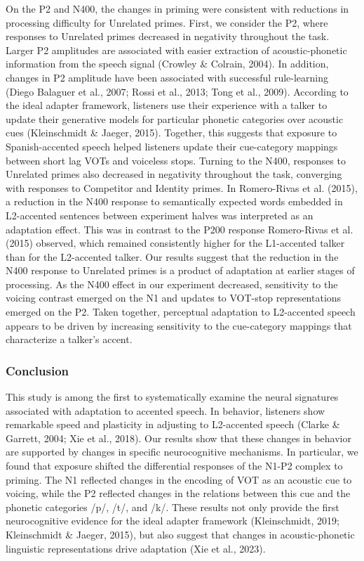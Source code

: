 \documentclass[
  12pt,
  twoside]{article}
\begin{document}
On the P2 and N400, the changes in priming were consistent with reductions in processing difficulty for Unrelated primes.
First, we consider the P2, where responses to Unrelated primes decreased in negativity throughout the task.
Larger P2 amplitudes are associated with easier extraction of acoustic-phonetic information from the speech signal (Crowley \& Colrain, 2004).
In addition, changes in P2 amplitude have been associated with successful rule-learning (Diego Balaguer et al., 2007; Rossi et al., 2013; Tong et al., 2009).
According to the ideal adapter framework, listeners use their experience with a talker to update their generative models for particular phonetic categories over acoustic cues (Kleinschmidt \& Jaeger, 2015).
Together, this suggests that exposure to Spanish-accented speech helped listeners update their cue-category mappings between short lag VOTs and voiceless stops.
Turning to the N400, responses to Unrelated primes also decreased in negativity throughout the task, converging with responses to Competitor and Identity primes.
In Romero-Rivas et al. (2015), a reduction in the N400 response to semantically expected words embedded in L2-accented sentences between experiment halves was interpreted as an adaptation effect.
This was in contrast to the P200 response Romero-Rivas et al. (2015) observed, which remained consistently higher for the L1-accented talker than for the L2-accented talker.
Our results suggest that the reduction in the N400 response to Unrelated primes is a product of adaptation at earlier stages of processing.
As the N400 effect in our experiment decreased, sensitivity to the voicing contrast emerged on the N1 and updates to VOT-stop representations emerged on the P2.
Taken together, perceptual adaptation to L2-accented speech appears to be driven by increasing sensitivity to the cue-category mappings that characterize a talker's accent.

\hypertarget{conclusion-1}{%
\subsubsection{Conclusion}\label{conclusion-1}}

This study is among the first to systematically examine the neural signatures associated with adaptation to accented speech.
In behavior, listeners show remarkable speed and plasticity in adjusting to L2-accented speech (Clarke \& Garrett, 2004; Xie et al., 2018).
Our results show that these changes in behavior are supported by changes in specific neurocognitive mechanisms.
In particular, we found that exposure shifted the differential responses of the N1-P2 complex to priming.
The N1 reflected changes in the encoding of VOT as an acoustic cue to voicing, while the P2 reflected changes in the relations between this cue and the phonetic categories /p/, /t/, and /k/.
These results not only provide the first neurocognitive evidence for the ideal adapter framework (Kleinschmidt, 2019; Kleinschmidt \& Jaeger, 2015), but also suggest that changes in acoustic-phonetic linguistic representations drive adaptation (Xie et al., 2023).
\end{document}
